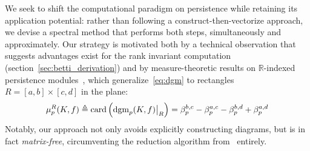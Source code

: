 \documentclass[10pt]{article}
\numberwithin{equation}{section}
\newcommand{\+}{%
	\raisebox{0.18ex}{\scaleobj{0.55}{+}}
}
\newcommand\restr[2]{{%
  \left.\kern-\nulldelimiterspace %
  #1 %
  \vphantom{\big|} %
  \right|_{#2} %
  }}
\theoremstyle{definition}
\theoremstyle{definition}
\begin{document}


We seek to shift the computational paradigm on persistence while retaining its application potential: 
rather than following a construct-then-vectorize approach,
we devise a spectral method 
that performs both steps, simultaneously and approximately. 
Our strategy is motivated both by a technical observation that suggests advantages exist for the rank invariant computation (section~\ref{sec:betti_derivation}) and by measure-theoretic results on $\mathbb{R}$-indexed persistence modules~\cite{cerri2013betti, chazal2016structure}, which generalize~\eqref{eq:dgm} to rectangles $R = [a,b] \times [c,d]$ in the plane:
\begin{equation}\label{eq:measure}
\mu_p^R(K, f) \triangleq \mathrm{card}\left(\restr{\mathrm{dgm}_p(K, f)}{R} \right) = \beta_{p}^{b,c} - \beta_{p}^{a,c} - \beta_{p}^{b,d} + \beta_{p}^{a,d}
% 
\end{equation}
Notably, our approach not only avoids explicitly constructing diagrams, but is in fact \emph{matrix-free}, circumventing the reduction algorithm from~\cite{edelsbrunner2022computational} entirely.  
\end{document}
